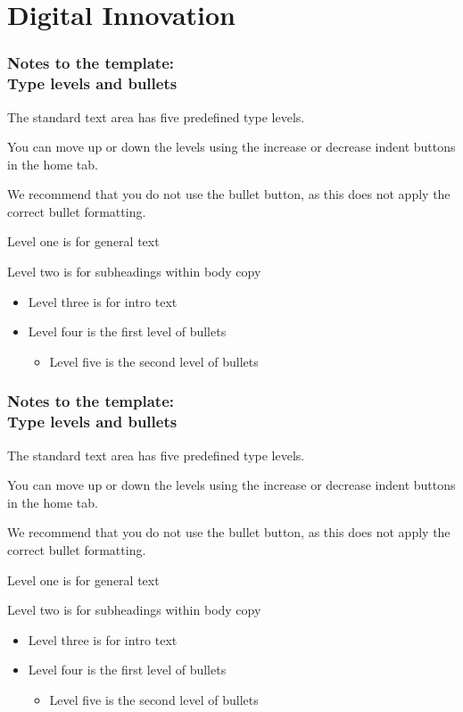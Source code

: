 \documentclass[11pt,aspectratio=169,t]{beamer}
\begin{document}
\section{Digital Innovation}


\begin{frame}
  \frametitle{Notes to the template:\\Type levels and bullets}

  The standard text area has five predefined type levels.
    
  You can move up or down the levels using the increase or decrease indent buttons in the home tab.
  
  We recommend that you do not use the bullet button, as this does not apply the correct bullet formatting.
  
  Level one is for general text
  
  Level two is for subheadings within body copy
  
\begin{itemize}
\item Level three is for intro text
\item Level four is the first level of bullets
  \begin{itemize}
  \item Level five is the second level of bullets
  \end{itemize}
\end{itemize}
\end{frame}

\begin{frame}
  \frametitle{Notes to the template:\\Type levels and bullets}

  The standard text area has five predefined type levels.
    
  You can move up or down the levels using the increase or decrease indent buttons in the home tab.
  
  We recommend that you do not use the bullet button, as this does not apply the correct bullet formatting.
  
  Level one is for general text
  
  Level two is for subheadings within body copy
  
\begin{itemize}
\item Level three is for intro text
\item Level four is the first level of bullets
  \begin{itemize}
  \item Level five is the second level of bullets
  \end{itemize}
\end{itemize}
\end{frame}
\end{document}
